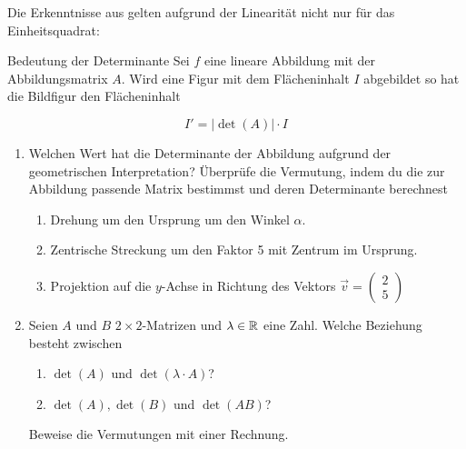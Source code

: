   \clearpage
  Die Erkenntnisse aus  gelten aufgrund der Linearität nicht nur für das Einheitsquadrat:
  \begin{satz}
    {Bedeutung der Determinante}{}
    Sei $f$ eine lineare Abbildung mit der Abbildungsmatrix $A$. Wird eine Figur mit dem Flächeninhalt $I$ abgebildet so hat die Bildfigur den Flächeninhalt

    $$ I' = |\det(A)| \cdot I$$
  \end{satz}

  \begin{ueb}
    {}{}
    \begin{enumerate}
        \item Welchen Wert hat die Determinante der Abbildung aufgrund der geometrischen Interpretation? Überprüfe die Vermutung, indem du die zur Abbildung passende Matrix bestimmst und deren Determinante berechnest
         \begin{enumerate}
            \item Drehung um den Ursprung um den Winkel \( \alpha \).
            \item Zentrische Streckung um den Faktor 5 mit Zentrum im Ursprung. 
            \item Projektion auf die \( y \)-Achse in Richtung des Vektors \( \vec{v} = \begin{pmatrix} 2 \\ 5 \end{pmatrix} \)
          \end{enumerate}
        \item Seien $A$ und $B$ $2\times2$-Matrizen und $\lambda\in\mathbb{R}$ eine Zahl. Welche Beziehung besteht zwischen 
        \begin{enumerate}
            \item $\det(A)$ und $\det(\lambda\cdot A)$?
            \item $\det(A), \det(B)$ und $\det(AB)$?
        \end{enumerate}
        Beweise die Vermutungen mit einer Rechnung.
    \end{enumerate}
  \end{ueb}
  

























